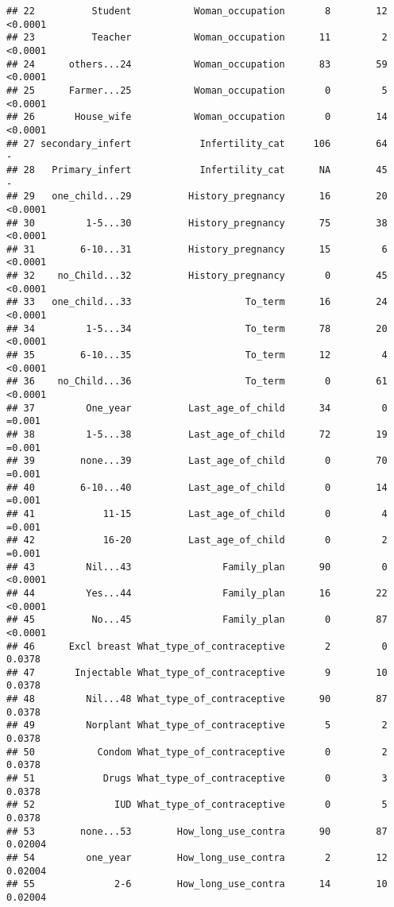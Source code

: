 \documentclass[
]{article}
\begin{document}
\begin{verbatim}
## 22          Student           Woman_occupation       8        12   <0.0001
## 23          Teacher           Woman_occupation      11         2   <0.0001
## 24      others...24           Woman_occupation      83        59   <0.0001
## 25      Farmer...25           Woman_occupation       0         5   <0.0001
## 26       House_wife           Woman_occupation       0        14   <0.0001
## 27 secondary_infert            Infertility_cat     106        64         -
## 28   Primary_infert            Infertility_cat      NA        45         -
## 29   one_child...29          History_pregnancy      16        20   <0.0001
## 30         1-5...30          History_pregnancy      75        38   <0.0001
## 31        6-10...31          History_pregnancy      15         6   <0.0001
## 32    no_Child...32          History_pregnancy       0        45   <0.0001
## 33   one_child...33                    To_term      16        24   <0.0001
## 34         1-5...34                    To_term      78        20   <0.0001
## 35        6-10...35                    To_term      12         4   <0.0001
## 36    no_Child...36                    To_term       0        61   <0.0001
## 37         One_year          Last_age_of_child      34         0    =0.001
## 38         1-5...38          Last_age_of_child      72        19    =0.001
## 39        none...39          Last_age_of_child       0        70    =0.001
## 40        6-10...40          Last_age_of_child       0        14    =0.001
## 41            11-15          Last_age_of_child       0         4    =0.001
## 42            16-20          Last_age_of_child       0         2    =0.001
## 43         Nil...43                Family_plan      90         0   <0.0001
## 44         Yes...44                Family_plan      16        22   <0.0001
## 45          No...45                Family_plan       0        87   <0.0001
## 46      Excl breast What_type_of_contraceptive       2         0    0.0378
## 47       Injectable What_type_of_contraceptive       9        10    0.0378
## 48         Nil...48 What_type_of_contraceptive      90        87    0.0378
## 49         Norplant What_type_of_contraceptive       5         2    0.0378
## 50           Condom What_type_of_contraceptive       0         2    0.0378
## 51            Drugs What_type_of_contraceptive       0         3    0.0378
## 52              IUD What_type_of_contraceptive       0         5    0.0378
## 53        none...53        How_long_use_contra      90        87   0.02004
## 54         one_year        How_long_use_contra       2        12   0.02004
## 55              2-6        How_long_use_contra      14        10   0.02004

\end{verbatim}
\end{document}
